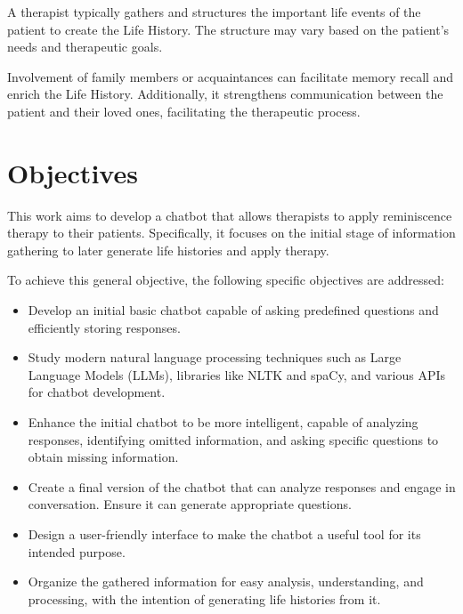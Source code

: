 A therapist typically gathers and structures the important life events of the patient to create the Life History. The structure may vary based on the patient's needs and therapeutic goals.

Involvement of family members or acquaintances can facilitate memory recall and enrich the Life History. Additionally, it strengthens communication between the patient and their loved ones, facilitating the therapeutic process.

\section{Objectives}
\label{sec:objectives}
This work aims to develop a chatbot that allows therapists to apply reminiscence therapy to their patients. Specifically, it focuses on the initial stage of information gathering to later generate life histories and apply therapy.

To achieve this general objective, the following specific objectives are addressed:

\begin{itemize}
	
	\item Develop an initial basic chatbot capable of asking predefined questions and efficiently storing responses.
	
	\item Study modern natural language processing techniques such as Large Language Models (LLMs), libraries like NLTK and spaCy, and various APIs for chatbot development.
	
	\item Enhance the initial chatbot to be more intelligent, capable of analyzing responses, identifying omitted information, and asking specific questions to obtain missing information.
	
	\item Create a final version of the chatbot that can analyze responses and engage in conversation. Ensure it can generate appropriate questions.
	
	\item Design a user-friendly interface to make the chatbot a useful tool for its intended purpose.
	
	\item Organize the gathered information for easy analysis, understanding, and processing, with the intention of generating life histories from it.
	
\end{itemize}

